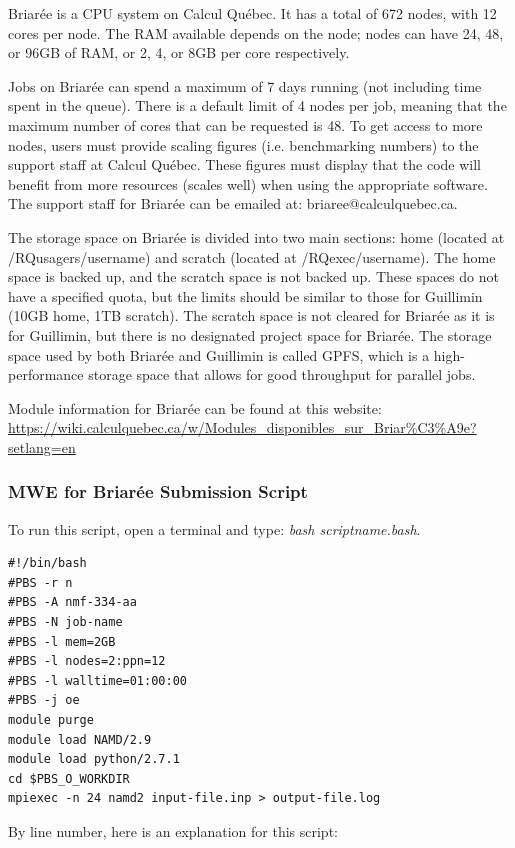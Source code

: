 \documentclass[12pt]{article}
\begin{document}
\quad Briar\'{e}e is a CPU system on Calcul Qu\'{e}bec. It has a total of 672 nodes, with 12 cores per node. The RAM available depends on the node; nodes can have 24, 48, or 96GB of RAM, or 2, 4, or 8GB per core respectively.

\quad Jobs on Briar\'{e}e can spend a maximum of 7 days running (not including time spent in the queue). There is a default limit of 4 nodes per job, meaning that the maximum number of cores that can be requested is 48. To get access to more nodes, users must provide scaling figures (i.e. benchmarking numbers) to the support staff at Calcul Qu\'{e}bec. These figures must display that the code will benefit from more resources (scales well) when using the appropriate software. The support staff for Briar\'{e}e can be emailed at: briaree@calculquebec.ca.

\quad The storage space on Briar\'{e}e is divided into two main sections: home (located at /RQusagers/username) and scratch (located at /RQexec/username). The home space is backed up, and the scratch space is not backed up. These spaces do not have a specified quota, but the limits should be similar to those for Guillimin (10GB home, 1TB scratch). The scratch space is not cleared for Briar\'{e}e as it is for Guillimin, but there is no designated project space for Briar\'{e}e. The storage space used by both Briar\'{e}e and Guillimin is called GPFS, which is a high-performance storage space that allows for good throughput for parallel jobs.

\quad Module information for Briar\'{e}e can be found at this website: \url{https://wiki.calculquebec.ca/w/Modules_disponibles_sur_Briar%C3%A9e?setlang=en}

\subsubsection{MWE for Briar\'{e}e Submission Script}
\quad To run this script, open a terminal and type: \textit{bash scriptname.bash}. 
\begin{lstlisting}
#!/bin/bash
#PBS -r n
#PBS -A nmf-334-aa
#PBS -N job-name
#PBS -l mem=2GB
#PBS -l nodes=2:ppn=12
#PBS -l walltime=01:00:00
#PBS -j oe
module purge
module load NAMD/2.9
module load python/2.7.1
cd $PBS_O_WORKDIR
mpiexec -n 24 namd2 input-file.inp > output-file.log
\end{lstlisting}

\quad By line number, here is an explanation for this script:
\end{document}
